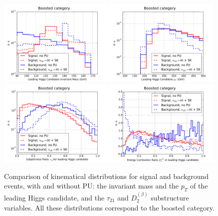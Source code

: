 \begin{figure}[t]
  \begin{center}
  \includegraphics[width=0.49\textwidth]{plots/m_h0_bst_comp_back.pdf}
  \includegraphics[width=0.49\textwidth]{plots/pt_h0_bst_comp_back.pdf}
   \includegraphics[width=0.49\textwidth]{plots/tau21_h1_bst_comp_back.pdf}
  \includegraphics[width=0.49\textwidth]{plots/D2_h0_bst_comp_back.pdf}
   \caption{\small
     Comparison of kinematical distributions for signal and background events,
     with and without PU: the invariant mass and the $p_T$ of the leading
     Higgs candidate, and the $\tau_{21}$ and $D^{(\beta)}_2$ substructure variables.
     All these distributions correspond to the boosted category.
}
\label{fig:signal-vs-back-boosted}
\end{center}
\end{figure}



